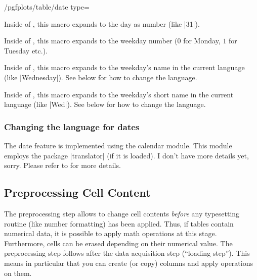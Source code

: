 \documentclass[a4paper]{ltxdoc}
\begin{document}
\begin{stylekey}{/pgfplots/table/date type=}
    \begin{command}{\day}
        Inside of , this macro expands to the day as number
        (like |31|).
    \end{command}

    \begin{command}{\weekday}
        Inside of , this macro expands to the weekday number
        ($0$ for Monday, $1$ for Tuesday etc.).
    \end{command}

    \begin{command}{\weekdayname}
        Inside of , this macro expands to the weekday's name
        in the current language (like |Wednesday|). See below for how to change
        the language.
    \end{command}

    \begin{command}{\weekdayshortname}
        Inside of , this macro expands to the weekday's short
        name in the current language (like |Wed|). See below for how to change
        the language.
    \end{command}


    \subsubsection*{Changing the language for dates}

    The date feature is implemented using the \PGF{} calendar module. This
    module employs the package |translator| (if it is loaded). I don't have
    more details yet, sorry. Please refer to \cite{tikz} for more details.
\end{stylekey}


\subsection{Preprocessing Cell Content}
\label{sec:pgfplotstable:preproc}

The preprocessing step allows to change cell contents \emph{before} any
typesetting routine (like number formatting) has been applied. Thus, if tables
contain numerical data, it is possible to apply math operations at this stage.
Furthermore, cells can be erased depending on their numerical value. The
preprocessing step follows after the data acquisition step (``loading step'').
This means in particular that you can create (or copy) columns and apply
operations on them.
\end{document}
